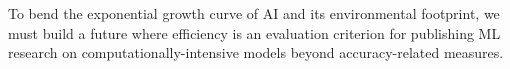 To bend the exponential growth curve of AI and its environmental footprint, we must build a future where efficiency is an evaluation criterion for publishing ML research on computationally-intensive models beyond accuracy-related measures. 






